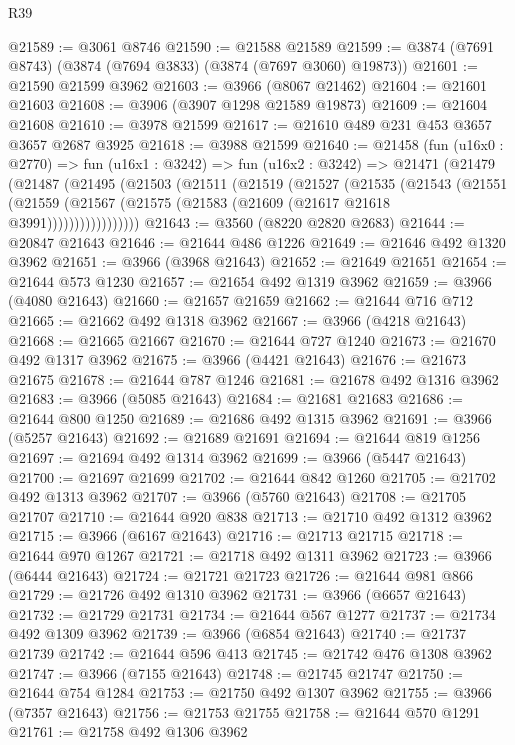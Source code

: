 \begin{lexlean}{R39}
\begin{coremodule}
@21589 := @3061 @8746
@21590 := @21588 @21589
@21599 := @3874 (@7691 @8743) (@3874 (@7694 @3833) (@3874 (@7697 @3060) @19873))
@21601 := @21590 @21599 @3962
@21603 := @3966 (@8067 @21462)
@21604 := @21601 @21603
@21608 := @3906 (@3907 @1298 @21589 @19873)
@21609 := @21604 @21608
@21610 := @3978 @21599
@21617 := @21610 @489 @231 @453 @3657 @3657 @2687 @3925
@21618 := @3988 @21599
@21640 := @21458
    (fun (u16x0 : @2770) =>
    fun (u16x1 : @3242) =>
    fun (u16x2 : @3242) =>
    @21471
      (@21479
        (@21487
          (@21495
            (@21503
              (@21511
                (@21519
                  (@21527
                    (@21535
                      (@21543
                        (@21551
                          (@21559
                            (@21567 (@21575 (@21583 (@21609 (@21617 @21618 @3991)))))))))))))))))
@21643 := @3560 (@8220 @2820 @2683)
@21644 := @20847 @21643
@21646 := @21644 @486 @1226
@21649 := @21646 @492 @1320 @3962
@21651 := @3966 (@3968 @21643)
@21652 := @21649 @21651
@21654 := @21644 @573 @1230
@21657 := @21654 @492 @1319 @3962
@21659 := @3966 (@4080 @21643)
@21660 := @21657 @21659
@21662 := @21644 @716 @712
@21665 := @21662 @492 @1318 @3962
@21667 := @3966 (@4218 @21643)
@21668 := @21665 @21667
@21670 := @21644 @727 @1240
@21673 := @21670 @492 @1317 @3962
@21675 := @3966 (@4421 @21643)
@21676 := @21673 @21675
@21678 := @21644 @787 @1246
@21681 := @21678 @492 @1316 @3962
@21683 := @3966 (@5085 @21643)
@21684 := @21681 @21683
@21686 := @21644 @800 @1250
@21689 := @21686 @492 @1315 @3962
@21691 := @3966 (@5257 @21643)
@21692 := @21689 @21691
@21694 := @21644 @819 @1256
@21697 := @21694 @492 @1314 @3962
@21699 := @3966 (@5447 @21643)
@21700 := @21697 @21699
@21702 := @21644 @842 @1260
@21705 := @21702 @492 @1313 @3962
@21707 := @3966 (@5760 @21643)
@21708 := @21705 @21707
@21710 := @21644 @920 @838
@21713 := @21710 @492 @1312 @3962
@21715 := @3966 (@6167 @21643)
@21716 := @21713 @21715
@21718 := @21644 @970 @1267
@21721 := @21718 @492 @1311 @3962
@21723 := @3966 (@6444 @21643)
@21724 := @21721 @21723
@21726 := @21644 @981 @866
@21729 := @21726 @492 @1310 @3962
@21731 := @3966 (@6657 @21643)
@21732 := @21729 @21731
@21734 := @21644 @567 @1277
@21737 := @21734 @492 @1309 @3962
@21739 := @3966 (@6854 @21643)
@21740 := @21737 @21739
@21742 := @21644 @596 @413
@21745 := @21742 @476 @1308 @3962
@21747 := @3966 (@7155 @21643)
@21748 := @21745 @21747
@21750 := @21644 @754 @1284
@21753 := @21750 @492 @1307 @3962
@21755 := @3966 (@7357 @21643)
@21756 := @21753 @21755
@21758 := @21644 @570 @1291
@21761 := @21758 @492 @1306 @3962

\end{coremodule}
\end{lexlean}
